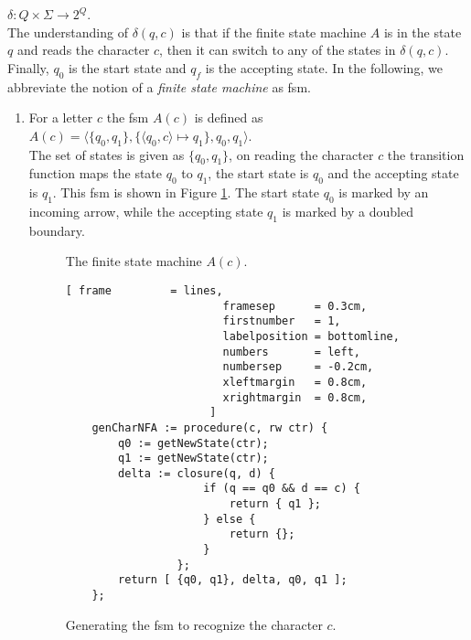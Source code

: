 \hspace*{1.3cm}
$\delta: Q \times \Sigma \rightarrow 2^Q$.
\\[0.2cm]
The understanding  of $\delta(q,c)$ is that if the finite state machine $A$ is in the
state $q$ and reads the character $c$, then it can switch to any of the states in
$\delta(q,c)$.
Finally, $q_0$ is the start state and $q_f$ is the accepting state.  In the following, we
abbreviate the notion of a  
\emph{finite state machine} as fsm.
\begin{enumerate}
\item For a letter $c$ the fsm $A(c)$ is defined as
      \\[0.2cm]
      \hspace*{1.3cm}
      $A(c) = \langle \{ q_0, q_1 \}, 
                      \{ \langle q_0, c \rangle \mapsto q_1\}, q_0, q_1  \rangle$.
      \\[0.2cm]
      The set of states is given as $\{ q_0, q_1 \}$, on reading the character $c$ the
      transition function maps the state $q_0$ to $q_1$, the start state is $q_0$ and the
      accepting state is $q_1$.  This fsm is shown in Figure
      \ref{fig:aChar.eps}.  The start state $q_0$ is marked by an incoming arrow, while the
      accepting state $q_1$ is marked by a doubled boundary. 

      \begin{figure}[!ht]
        \centering
      \caption{The finite state machine $A(c)$.}
      \label{fig:aChar.eps}
      \end{figure}

      \begin{figure}[!ht]
      \centering
      \begin{Verbatim}[ frame         = lines, 
                        framesep      = 0.3cm, 
                        firstnumber   = 1,
                        labelposition = bottomline,
                        numbers       = left,
                        numbersep     = -0.2cm,
                        xleftmargin   = 0.8cm,
                        xrightmargin  = 0.8cm,
                      ]
    genCharNFA := procedure(c, rw ctr) {
        q0 := getNewState(ctr);
        q1 := getNewState(ctr);
        delta := closure(q, d) { 
                     if (q == q0 && d == c) { 
                         return { q1 };
                     } else { 
                         return {};
                     }
                 };
        return [ {q0, q1}, delta, q0, q1 ];
    };
      \end{Verbatim}
      \vspace*{-0.3cm}
      \caption{Generating the fsm to recognize the character $c$.}
      \label{fig:genCharNFA.stlx}
      \end{figure}


\end{enumerate}
